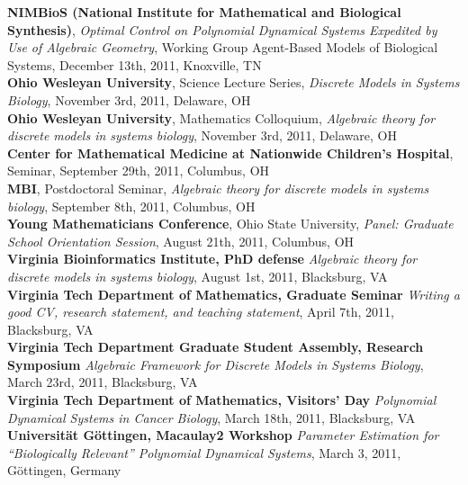 \documentclass[10pt]{article}
\begin{document}
\textbf{NIMBioS (National Institute for Mathematical and Biological Synthesis)}, {\it Optimal Control on Polynomial Dynamical Systems Expedited by Use of Algebraic Geometry}, Working Group Agent-Based Models of Biological Systems, December 13th, 2011, Knoxville, TN\\

\textbf{Ohio Wesleyan University}, Science Lecture Series, {\it Discrete Models in Systems Biology}, November 3rd, 2011, Delaware, OH\\

\textbf{Ohio Wesleyan University}, Mathematics Colloquium, {\it Algebraic theory for discrete models in systems biology}, November 3rd, 2011, Delaware, OH\\

\textbf{Center for Mathematical Medicine at Nationwide Children's Hospital}, Seminar, September 29th, 2011, Columbus, OH\\

\textbf{MBI}, Postdoctoral Seminar, {\it Algebraic theory for discrete models in systems biology}, September 8th, 2011, Columbus, OH\\

\textbf{Young Mathematicians Conference}, Ohio State University, {\it Panel: Graduate School Orientation Session}, August 21th, 2011, Columbus, OH\\

\textbf{Virginia Bioinformatics Institute, PhD defense}
\textit{Algebraic theory for discrete models in systems biology}, August 1st, 2011, Blacksburg, VA\\

\textbf{Virginia Tech Department of Mathematics, Graduate Seminar}
\textit{Writing a good CV, research statement, and teaching statement}, April
7th, 2011, Blacksburg, VA\\

\textbf{Virginia Tech Department Graduate Student Assembly, Research
Symposium}
\textit{Algebraic Framework for Discrete Models in Systems Biology}, March
23rd, 2011, Blacksburg, VA\\

\textbf{Virginia Tech Department of Mathematics, Visitors' Day}
\textit{Polynomial Dynamical Systems in Cancer Biology}, March 18th, 2011,
Blacksburg, VA\\

\textbf{Universit\"at G\"ottingen, Macaulay2 Workshop} \textit{Parameter
Estimation for ``Biologically Relevant'' Polynomial Dynamical Systems}, March
3, 2011, G\"ottingen, Germany\\
\end{document}
